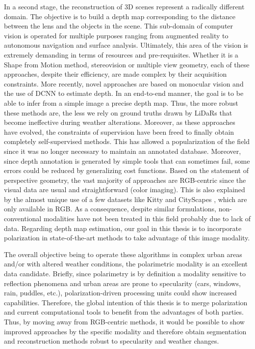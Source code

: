 In a second stage, the reconstruction of 3D scenes represent a radically different domain. The objective is to build a depth map corresponding to the distance between the lens and the objects in the scene. This sub-domain of computer vision is operated for multiple purposes ranging from augmented reality to autonomous navigation and surface analysis. 
Ultimately, this area of the vision is extremely demanding in terms of resources and pre-requisites. Whether it is a Shape from Motion method, stereovision or multiple view geometry, each of these approaches, despite their efficiency, are made complex by their acquisition constraints.
More recently, novel approaches are based on monocular vision and the use of DCNN to estimate depth. In an end-to-end manner, the goal is to be able to infer from a simple image a precise depth map. Thus, the more robust these methods are, the less we rely on ground truths drawn by LiDaRs that become ineffective during weather alterations. Moreover, as these approaches have evolved, the constraints of supervision have been freed to finally obtain completely self-supervised methods. This has allowed a popularization of the field since it was no longer necessary to maintain an annotated database. Moreover, since depth annotation is generated by simple tools that can sometimes fail, some errors could be reduced by generalizing cost functions.
Based on the statement of perspective geometry, the vast majority of approaches are RGB-centric since the visual data are usual and straightforward (color imaging). This is also explained by the almost unique use of a few datasets like Kitty \cite{Geiger2012CVPR} and CityScapes \cite{Cordts2016Cityscapes}, which are only available in RGB.
As a consequence, despite similar formulations, non-conventional modalities have not been treated in this field probably due to lack of data. 
Regarding depth map estimation, our goal in this thesis is to incorporate polarization in state-of-the-art methods to take advantage of this image modality. 

The overall objective being to operate these algorithms in complex urban areas and/or with altered weather conditions, the polarimetric modality is an excellent data candidate. Briefly, since polarimetry is by definition a modality sensitive to reflection phenomena and urban areas are prone to specularity (cars, windows, rain, puddles, etc.), polarization-driven processing units could show increased capabilities.
Therefore, the global intention of this thesis is to merge polarization and current computational tools to benefit from the advantages of both parties. Thus, by moving away from RGB-centric methods, it would be possible to show improved approaches by the specific modality and therefore obtain segmentation and reconstruction methods robust to specularity and weather changes.


